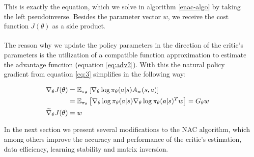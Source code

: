 \noindent This is exactly the equation, which we solve in algorithm \ref{enac-algo} by taking the left pseudoinverse. Besides the parameter vector $w$, we receive the cost function $J(\theta)$ as a side product.
\\\\
 The reason why we update the policy parameters in the direction of the critic's parameters is the utilization of a compatible function approximation to estimate the advantage function (equation \ref{eq:adv2}). With this the natural policy gradient from equation \ref{eq:3} simplifies in the following way:

\begin{align}
\nabla_\theta J(\theta) &= \operatorname{\mathbb{E}}_{\pi_{\theta}} \left[\nabla_{\theta} \log \pi_{\theta}(a|s) A_w(s, a)\right]\\
&= \operatorname{\mathbb{E}}_{\pi_{\theta}}  \left[\nabla_{\theta} \log \pi_{\theta}(a|s) \nabla_{\theta} \log \pi_{\theta}(a|s)^T w\right]
= G_\theta w\\
\widetilde{\nabla}_{\theta} J(\theta) &= w
\end{align}

\noindent In the next section we present several modifications to the NAC algorithm, which among others improve the accuracy and performance of the critic's estimation, data efficiency, learning stability and matrix inversion.

